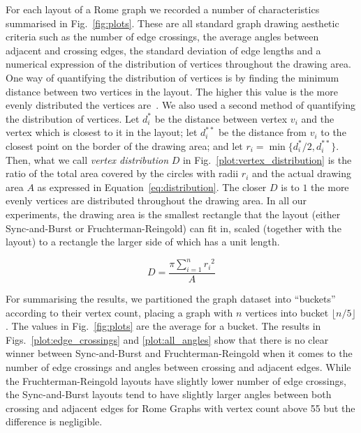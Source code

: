 \documentclass{llncs}
\begin{document}
For each layout of a Rome graph we recorded a number of characteristics summarised in Fig.~\ref{fig:plots}. These are all standard graph drawing aesthetic criteria such as the number of edge crossings, the average angles between adjacent and crossing edges, the standard deviation of edge lengths and a numerical expression of the distribution of vertices throughout the drawing area. One way of quantifying the distribution of vertices is by finding the minimum distance between two vertices in the layout. The higher this value is the more evenly distributed the vertices are~\cite{LyoMeiRap1998}. We also used a second method of quantifying the distribution of vertices. Let $d^*_i$ be the distance between vertex $v_i$ and the vertex which is closest to it in the layout; let $d^{**}_i$ be the distance from $v_i$ to the closest point on the border of the drawing area; and let $r_i = \min\{d^*_i/2, d^{**}_i\}$. Then, what we call \emph{vertex distribution} $D$ in Fig.~\ref{plot:vertex_distribution} is the ratio of the total area covered by the circles with radii $r_i$ and the actual drawing area $A$ as expressed in Equation~\eqref{eq:distribution}. The closer $D$ is to $1$ the more evenly vertices are distributed throughout the drawing area. In all our experiments, the drawing area is the smallest rectangle that the layout (either Sync-and-Burst or Fruchterman-Reingold) can fit in, scaled (together with the layout) to a rectangle the larger side of which has a unit length.

\begin{equation} 
\label{eq:distribution}
D =\frac{\pi\sum_{i=1}^n{r_i}^2}{A}
\end{equation}

For summarising the results, we partitioned the graph dataset into ``buckets'' according to their vertex count, placing a graph with $n$ vertices into bucket $\lfloor n/5 \rfloor$. The values in Fig.~\ref{fig:plots} are the average for a bucket. The results in Figs.~\ref{plot:edge_crossings} and \ref{plot:all_angles} show that there is no clear winner between Sync-and-Burst and Fruchter\-man-Reingold when it comes to the number of edge crossings and angles between crossing and adjacent edges. While the Fruchterman-Reingold layouts have slightly lower number of edge crossings, the Sync-and-Burst layouts tend to have slightly larger angles between both crossing and adjacent edges for Rome Graphs with vertex count above 55 but the difference is negligible.
\end{document}
